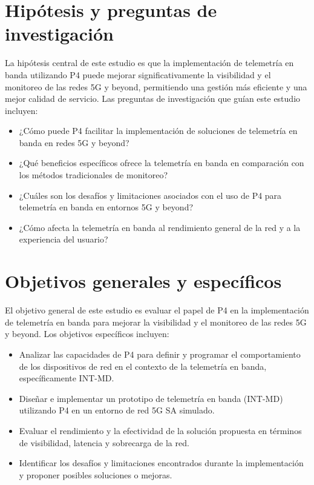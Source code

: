 \section{Hipótesis y preguntas de investigación}
La hipótesis central de este estudio es que la implementación de telemetría en banda utilizando P4 puede mejorar significativamente la visibilidad y el monitoreo de las redes 5G y beyond, permitiendo una gestión más eficiente y una mejor calidad de servicio. Las preguntas de investigación que guían este estudio incluyen:
\begin{itemize}
    \item ¿Cómo puede P4 facilitar la implementación de soluciones de telemetría en banda en redes 5G y beyond?
    \item ¿Qué beneficios específicos ofrece la telemetría en banda en comparación con los métodos tradicionales de monitoreo?
    \item ¿Cuáles son los desafíos y limitaciones asociados con el uso de P4 para telemetría en banda en entornos 5G y beyond?
    \item ¿Cómo afecta la telemetría en banda al rendimiento general de la red y a la experiencia del usuario?
\end{itemize}
\section{Objetivos generales y específicos}
El objetivo general de este estudio es evaluar el papel de P4 en la implementación de telemetría en banda para mejorar la visibilidad y el monitoreo de las redes 5G y beyond. Los objetivos específicos incluyen:
\begin{itemize}
    \item Analizar las capacidades de P4 para definir y programar el comportamiento de los dispositivos de red en el contexto de la telemetría en banda, específicamente INT-MD.
    \item Diseñar e implementar un prototipo de telemetría en banda (INT-MD) utilizando P4 en un entorno de red 5G SA simulado.
    \item Evaluar el rendimiento y la efectividad de la solución propuesta en términos de visibilidad, latencia y sobrecarga de la red.
    \item Identificar los desafíos y limitaciones encontrados durante la implementación y proponer posibles soluciones o mejoras.
\end{itemize}
